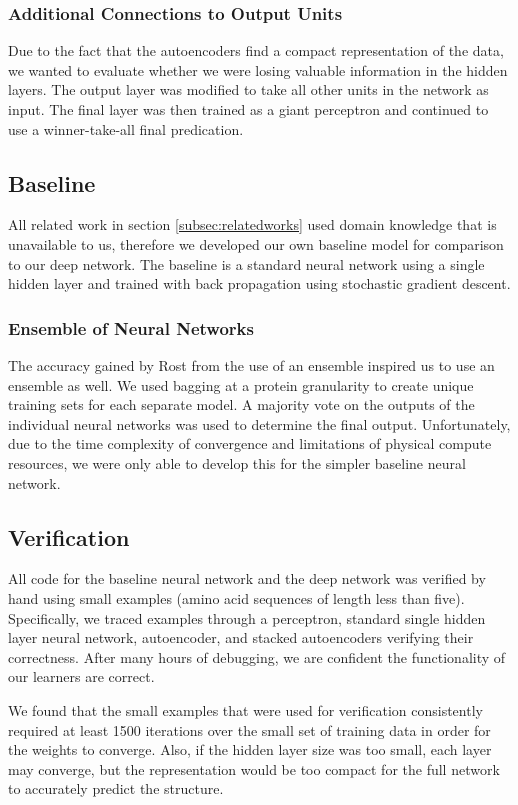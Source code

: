 \documentclass[letterpaper,twocolumn,12pt]{article}
\begin{document}
\subsubsection{Additional Connections to Output Units}
Due to the fact that the autoencoders find a compact representation of the data, we wanted to evaluate whether we were losing valuable information in the hidden layers.
The output layer was modified to take all other units in the network as input.
The final layer was then trained as a giant perceptron and continued to use a winner-take-all final predication.

\subsection{Baseline}
All related work in section \ref{subsec:relatedworks} used domain knowledge that is unavailable to us, therefore we developed our own baseline model for comparison to our deep network.
The baseline is a standard neural network using a single hidden layer and trained with back propagation using stochastic gradient descent.

\subsubsection{Ensemble of Neural Networks}
The accuracy gained by Rost from the use of an ensemble inspired us to use an ensemble as well.
We used bagging at a protein granularity to create unique training sets for each separate model.
A majority vote on the outputs of the individual neural networks was used to determine the final output.
Unfortunately, due to the time complexity of convergence and limitations of physical compute resources, we were only able to develop this for the simpler baseline neural network.

\subsection{Verification}
\label{subsec:verification}
All code for the baseline neural network and the deep network was verified by hand using small examples (amino acid sequences of length less than five).
Specifically, we traced examples through a perceptron, standard single hidden layer neural network, autoencoder, and stacked autoencoders verifying their correctness.
After many hours of debugging, we are confident the functionality of our learners are correct. 

We found that the small examples that were used for verification consistently required at least 1500 iterations over the small set of training data in order for the weights to converge.
Also, if the hidden layer size was too small, each layer may converge, but the representation would be too compact for the full network to accurately predict the structure.
\end{document}
